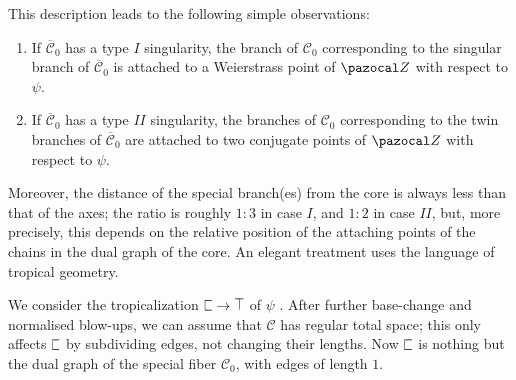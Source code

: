 \documentclass{compositio}
\newcommand{\tropC}{\scalebox{0.8}[1.3]{$\sqsubset$}}
\newcommand{\tropT}{\scalebox{0.9}[1.2]{$\top$}}
\renewcommand{\to}{\rightarrow}
\theoremstyle{plain}
\theoremstyle{definition}
\theoremstyle{remark}
\begin{document}
 This description leads to the following simple observations:
 
 \begin{enumerate}[label=(\Roman*)]
  \item If $\overline{\mathcal C}_0$ has a type $I$ singularity, the branch of ${\mathcal C}_0$ corresponding to the singular branch of $\overline{\mathcal C}_0$ is attached to a Weierstrass point of $\pazocal Z$ with respect to $\psi$.
  \item If $\overline{\mathcal C}_0$ has a type $I\!I$ singularity, the branches of ${\mathcal C}_0$ corresponding to the twin branches of $\overline{\mathcal C}_0$ are attached to two conjugate points of $\pazocal Z$ with respect to $\psi$.
 \end{enumerate}

 Moreover, the distance of the special branch(es) from the core is always less than that of the axes; the ratio is roughly $1:3$ in case $I$, and $1:2$ in case $I\!I$, but, more precisely, this depends on the relative position of the attaching points of the chains in the dual graph of the core. An elegant treatment uses the language of tropical geometry.

 We consider the tropicalization $\tropC\to\tropT$ of $\psi$ \cite{CMR}. After further base-change and normalised blow-ups, we can assume that $\mathcal C$ has regular total space; this only affects $\tropC$ by subdividing edges, not changing their lengths. Now $\tropC$ is nothing but the dual graph of the special fiber $\mathcal C_0$, with edges of length $1$.
 
\end{document}

